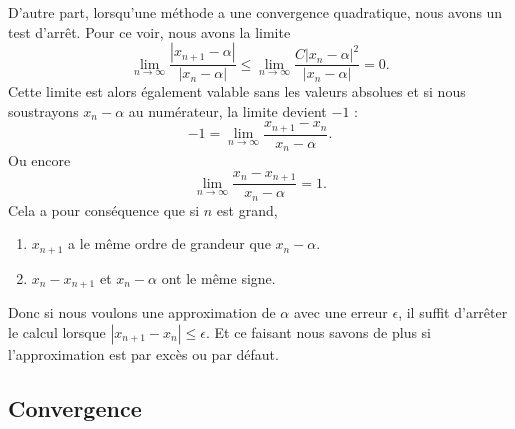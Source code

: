 \begin{normaltext}       \label{NTooVXLXooXlAGEq}
    D'autre part, lorsqu'une méthode a une convergence quadratique, nous avons un test d'arrêt. Pour ce voir, nous avons la limite
    \begin{equation}
        \lim_{n\to \infty} \frac{ | x_{n+1}-\alpha | }{ | x_n-\alpha | }\leq\lim_{n\to \infty} \frac{ C| x_n-\alpha |^2 }{ | x_n-\alpha | }=0.
    \end{equation}
    Cette limite est alors également valable sans les valeurs absolues et si nous soustrayons \( x_n-\alpha\) au numérateur, la limite devient \( -1\) :
    \begin{equation}
        -1=\lim_{n\to \infty} \frac{ x_{n+1}-x_n }{ x_n-\alpha }.
    \end{equation}
    Ou encore
    \begin{equation}
        \lim_{n\to \infty} \frac{ x_n-x_{n+1} }{ x_n-\alpha }=1.
    \end{equation}
    Cela a pour conséquence que si \( n\) est grand,
    \begin{enumerate}
        \item
            \( x_{n+1}\) a le même ordre de grandeur que \( x_n-\alpha\).
        \item
            \( x_n-x_{n+1}\) et \( x_n-\alpha\) ont le même signe.
    \end{enumerate}
    Donc si nous voulons une approximation de \( \alpha\) avec une erreur \( \epsilon\), il suffit d'arrêter le calcul lorsque \( | x_{n+1}-x_n |\leq \epsilon\). Et ce faisant nous savons de plus si l'approximation est par excès ou par défaut.
\end{normaltext}

\subsection{Convergence}

